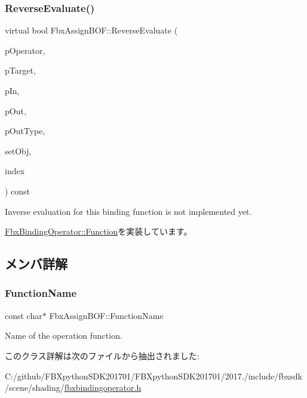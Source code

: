 \subsubsection{\texorpdfstring{Reverse\+Evaluate()}{ReverseEvaluate()}}
{\footnotesize\ttfamily virtual bool Fbx\+Assign\+B\+O\+F\+::\+Reverse\+Evaluate (\begin{DoxyParamCaption}\item[{const \hyperlink{class_fbx_binding_operator}{Fbx\+Binding\+Operator} $\ast$}]{p\+Operator,  }\item[{const \hyperlink{class_fbx_object}{Fbx\+Object} $\ast$}]{p\+Target,  }\item[{const void $\ast$}]{p\+In,  }\item[{void $\ast$$\ast$}]{p\+Out,  }\item[{\hyperlink{fbxpropertytypes_8h_a73913a5ddfb20e57c6f25e9e6784bd92}{E\+Fbx\+Type} $\ast$}]{p\+Out\+Type,  }\item[{bool}]{set\+Obj,  }\item[{int}]{index }\end{DoxyParamCaption}) const\hspace{0.3cm}{\ttfamily [virtual]}}



Inverse evaluation for this binding function is not implemented yet. 



\hyperlink{class_fbx_binding_operator_1_1_function_a9bbeec993a6e453a6569e7f40a85fd52}{Fbx\+Binding\+Operator\+::\+Function}を実装しています。



\subsection{メンバ詳解}
\mbox{\label{class_fbx_assign_b_o_f_a65ac910c4b20983717f7556ae8ee7a27}} 
\subsubsection{\texorpdfstring{Function\+Name}{FunctionName}}
{\footnotesize\ttfamily const char$\ast$ Fbx\+Assign\+B\+O\+F\+::\+Function\+Name\hspace{0.3cm}{\ttfamily [static]}}



Name of the operation function. 



このクラス詳解は次のファイルから抽出されました\+:\begin{DoxyCompactItemize}
\item 
C\+:/github/\+F\+B\+Xpython\+S\+D\+K201701/\+F\+B\+Xpython\+S\+D\+K201701/2017./include/fbxsdk/scene/shading/\hyperlink{fbxbindingoperator_8h}{fbxbindingoperator.\+h}\end{DoxyCompactItemize}
